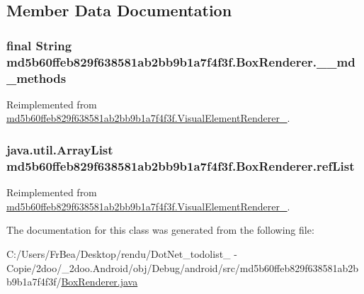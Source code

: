 \subsection{Member Data Documentation}
\hypertarget{classmd5b60ffeb829f638581ab2bb9b1a7f4f3f_1_1_box_renderer_5d93612d5b0a73e4f90ab9f50db54f92}{
\subsubsection[{\_\-\_\-md\_\-methods}]{\setlength{\rightskip}{0pt plus 5cm}final String {\bf md5b60ffeb829f638581ab2bb9b1a7f4f3f.BoxRenderer.\_\-\_\-md\_\-methods}}}
\label{classmd5b60ffeb829f638581ab2bb9b1a7f4f3f_1_1_box_renderer_5d93612d5b0a73e4f90ab9f50db54f92}




Reimplemented from \hyperlink{classmd5b60ffeb829f638581ab2bb9b1a7f4f3f_1_1_visual_element_renderer__1_4ef182bc984a4330ed789e1f0b0222d1}{md5b60ffeb829f638581ab2bb9b1a7f4f3f.VisualElementRenderer\_}.\hypertarget{classmd5b60ffeb829f638581ab2bb9b1a7f4f3f_1_1_box_renderer_a0eecfeb6a77a84fb7b0b7562f7b7d6e}{
\subsubsection[{refList}]{\setlength{\rightskip}{0pt plus 5cm}java.util.ArrayList {\bf md5b60ffeb829f638581ab2bb9b1a7f4f3f.BoxRenderer.refList}}}
\label{classmd5b60ffeb829f638581ab2bb9b1a7f4f3f_1_1_box_renderer_a0eecfeb6a77a84fb7b0b7562f7b7d6e}




Reimplemented from \hyperlink{classmd5b60ffeb829f638581ab2bb9b1a7f4f3f_1_1_visual_element_renderer__1_4ebd0e42ebd360712eb189930036fc9f}{md5b60ffeb829f638581ab2bb9b1a7f4f3f.VisualElementRenderer\_}.

The documentation for this class was generated from the following file:\begin{CompactItemize}
\item 
C:/Users/FrBea/Desktop/rendu/DotNet\_\-todolist\_ - Copie/2doo/\_\-2doo.Android/obj/Debug/android/src/md5b60ffeb829f638581ab2bb9b1a7f4f3f/\hyperlink{_box_renderer_8java}{BoxRenderer.java}\end{CompactItemize}

